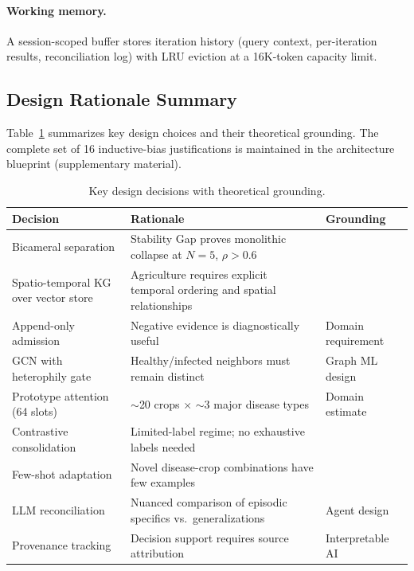 \documentclass{article}
\begin{document}
\paragraph{Working memory.}
A session-scoped buffer stores iteration history (query context, per-iteration
results, reconciliation log) with LRU eviction at a 16K-token capacity limit.

\subsection{Design Rationale Summary}
\label{sec:design}

Table~\ref{tab:design} summarizes key design choices and their theoretical
grounding. The complete set of 16 inductive-bias justifications is maintained in
the architecture blueprint (supplementary material).

\begin{table}[h]
\centering
\caption{Key design decisions with theoretical grounding.}
\label{tab:design}
\begin{tabular}{lp{6.5cm}p{5cm}}
\toprule
\textbf{Decision} & \textbf{Rationale} & \textbf{Grounding} \\
\midrule
Bicameral separation & Stability Gap proves monolithic collapse at $N=5$, $\rho>0.6$ &
\citep{stabilitygap2026} \\
Spatio-temporal KG over vector store & Agriculture requires explicit temporal ordering
and spatial relationships & \citep{zep2025} \\
Append-only admission & Negative evidence is diagnostically useful &
Domain requirement \\
GCN with heterophily gate & Healthy/infected neighbors must remain distinct &
Graph ML design \\
Prototype attention (64 slots) & $\sim$20 crops $\times$ $\sim$3 major disease types &
Domain estimate \\
Contrastive consolidation & Limited-label regime; no exhaustive labels needed &
\citep{chen2020simclr} \\
Few-shot adaptation & Novel disease-crop combinations have few examples &
\citep{snell2017} \\
LLM reconciliation & Nuanced comparison of episodic specifics vs.\ generalizations &
Agent design \\
Provenance tracking & Decision support requires source attribution &
Interpretable AI \\
\bottomrule
\end{tabular}
\end{table}
\end{document}
